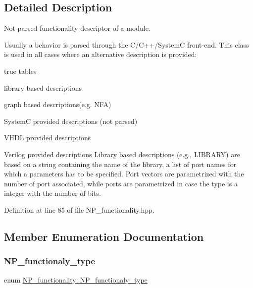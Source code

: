 \subsection{Detailed Description}
Not parsed functionality descriptor of a module. 

Usually a behavior is parsed through the C/\+C++/\+SystemC front-\/end. This class is used in all cases where an alternative description is provided\+:
\begin{DoxyItemize}
\item true tables
\item library based descriptions
\item graph based descriptions(e.\+g. N\+FA)
\item SystemC provided descriptions (not parsed)
\item V\+H\+DL provided descriptions
\item Verilog provided descriptions Library based descriptions (e.\+g., L\+I\+B\+R\+A\+RY) are based on a string containing the name of the library, a list of port names for which a parameters has to be specified. Port vectors are parametrized with the number of port associated, while ports are parametrized in case the type is a integer with the number of bits. 
\end{DoxyItemize}

Definition at line 85 of file N\+P\+\_\+functionality.\+hpp.



\subsection{Member Enumeration Documentation}
\mbox{\label{classNP__functionality_a318d6f254060bfdf145ebeb41efe772e}} 
\subsubsection{\texorpdfstring{N\+P\+\_\+functionaly\+\_\+type}{NP\_functionaly\_type}}
{\footnotesize\ttfamily enum \hyperlink{classNP__functionality_a318d6f254060bfdf145ebeb41efe772e}{N\+P\+\_\+functionality\+::\+N\+P\+\_\+functionaly\+\_\+type}}



